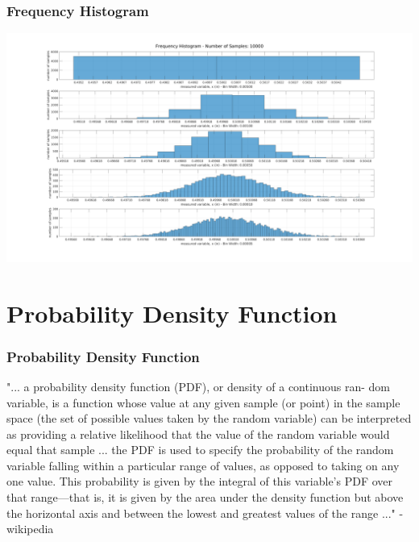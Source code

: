 \documentclass[fleqn]{beamer} %
\newcommand{\sectiontitleIII}{Frequency Histogram}
\newcommand{\sectiontitleIV}{Probability Density Function}
\begin{document}
	\begin{frame} \small
		\frametitle{\sectiontitleIII}    

	\includegraphics[scale=.25]{topic2_histogram_fig4}


	\end{frame}


\section{\sectiontitleIV}	
	\begin{frame}[label=sectionIV] \small
		\frametitle{\sectiontitleIV}    

"... a {\BL probability density function (PDF)}, or density of a continuous ran-
dom variable, is a function whose value at any given sample (or point) in
the sample space (the set of possible values taken by the random variable)
can be interpreted as providing a relative likelihood that the value of the
random variable would equal that sample ... the PDF is used to specify
the probability of the random variable falling within a particular range of
values, as opposed to taking on any one value. This probability is given
by the integral of this variable’s PDF over that range—that is, it is given
by the area under the density function but above the horizontal axis and
between the lowest and greatest values of the range ..." - wikipedia

	\end{frame}
	
\end{document}
